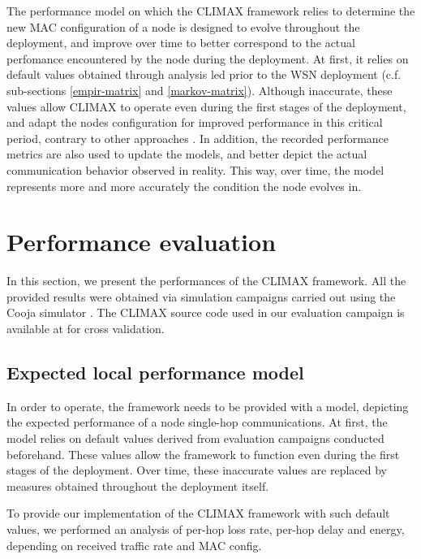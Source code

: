 \documentclass[12pt,journal,compsoc]{IEEEtran}
\begin{document}
The performance model on which the CLIMAX framework relies to determine the new MAC configuration of a node is designed to evolve throughout the deployment, and improve over time to better correspond to the actual perfomance encountered by the node during the deployment. At first, it relies on default values obtained through analysis led prior to the WSN deployment (c.f. sub-sections \ref{empir-matrix} and \ref{markov-matrix}). Although inaccurate, these values allow CLIMAX to operate even during the first stages of the deployment, and adapt the nodes configuration for improved performance in this critical period, contrary to other approaches \cite{zfm12ptunes, ecc12cross, mh10duty}. In addition, the recorded performance metrics are also used to update the models, and better depict the actual communication behavior observed in reality. This way, over time, the model represents more and more accurately the condition the node  evolves in.

\section{Performance evaluation}
\label{results}

In this section, we present the performances of the CLIMAX framework. All the provided results were obtained via simulation campaigns carried out using the Cooja simulator \cite{?}.
The CLIMAX source code used in our evaluation campaign is available at \cite{?} for cross validation.

\subsection{Expected local performance model}

In order to operate, the framework needs to be provided with a model, depicting the expected performance of a node single-hop communications. At first, the model relies on default values derived from evaluation campaigns conducted beforehand. These values allow the framework to function even during the first stages of the deployment. Over time, these inaccurate values are replaced by measures obtained throughout the deployment itself.

To provide our implementation of the CLIMAX framework with such default values, we performed an analysis of per-hop loss rate, per-hop delay and energy, depending on received traffic rate and MAC config.
\end{document}
